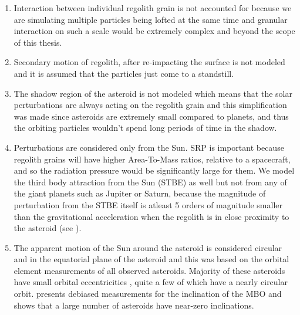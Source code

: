 \begin{enumerate}
\item Interaction between individual regolith grain is not accounted for because we are simulating multiple particles being lofted at the same time and granular interaction on such a scale would be extremely complex and beyond the scope of this thesis.

\item Secondary motion of regolith, after re-impacting the surface is not modeled and it is assumed that the particles just come to a standstill.

\item The shadow region of the asteroid is not modeled which means that the solar perturbations are always acting on the regolith grain and this simplification was made since asteroids are extremely small compared to planets, and thus the orbiting particles wouldn't spend long periods of time in the shadow.

\item Perturbations are considered only from the Sun. \gls{SRP} is important because regolith grains will have higher Area-To-Mass ratios, relative to a spacecraft, and so the radiation pressure would be significantly large for them. We model the third body attraction from the Sun (\gls{STBE}) as well but not from any of the giant planets such as Jupiter or Saturn, because the magnitude of perturbation from the \gls{STBE} itself is atleast 5 orders of magnitude smaller than the gravitational acceleration when the regolith is in close proximity to the asteroid (see ).

\item The apparent motion of the Sun around the asteroid is considered circular and in the equatorial plane of the asteroid and this was based on the orbital element measurements of all observed asteroids. Majority of these asteroids have small orbital eccentricities \parencite{malhotra2016_eccentricityDistribution}, quite a few of which have a nearly circular orbit. \cite{jedicke1998_orbitalElements} presents debiased measurements for the inclination of the \gls{MBO} and shows that a large number of asteroids have near-zero inclinations.
\end{enumerate}

